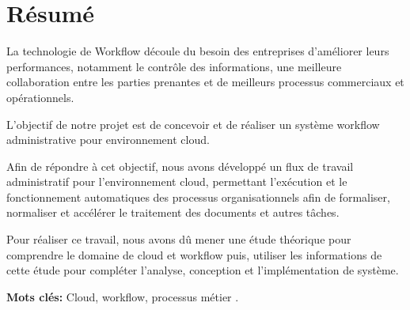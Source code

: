 \chapter*{Résumé}



La technologie de Workflow découle du besoin des entreprises d’améliorer leurs performances, notamment le contrôle des informations, une meilleure collaboration entre les parties prenantes et de meilleurs processus commerciaux et opérationnels.

L'objectif de notre projet est de concevoir et de réaliser un système workflow administrative  pour environnement cloud.
 

Afin de répondre à cet objectif,  nous avons développé un flux de travail administratif pour l'environnement cloud, permettant l'exécution et le fonctionnement automatiques des processus organisationnels afin de formaliser, normaliser et accélérer le traitement des documents et autres tâches.

Pour réaliser ce travail, nous avons dû mener une étude théorique pour comprendre le domaine de cloud  et workflow  puis, utiliser les informations de cette étude pour compléter l'analyse, conception et l'implémentation de système.



\textbf{Mots clés:} Cloud, workflow, processus métier .   




